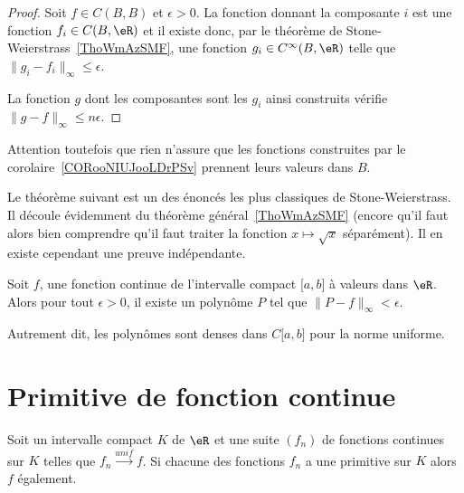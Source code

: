 \begin{proof}
    Soit \( f \in C(B,B)\) et \( \epsilon>0\). La fonction donnant la composante \( i\) est une fonction \( f_i\in C(B,\eR)\) et il existe donc, par le théorème de Stone-Weierstrass~\ref{ThoWmAzSMF}, une fonction \( g_i\in  C^{\infty}(B,\eR)\) telle que \( \| g_i-f_i \|_{\infty}\leq \epsilon\).

    La fonction \( g\) dont les composantes sont les \( g_i\) ainsi construits vérifie \( \| g-f \|_{\infty}\leq n\epsilon\).
\end{proof}

Attention toutefois que rien n'assure que les fonctions construites par le corolaire~\ref{CORooNIUJooLDrPSv} prennent leurs valeurs dans \( B\).

Le théorème suivant est un des énoncés les plus classiques de Stone-Weierstrass. Il découle évidemment du théorème général~\ref{ThoWmAzSMF} (encore qu'il faut alors bien comprendre qu'il faut traiter la fonction \( x\mapsto \sqrt{x}\) séparément). Il en existe cependant une preuve indépendante.

\begin{theorem}     \label{ThoGddfas}   
    Soit \( f\), une fonction continue de l'intervalle compact \( \mathopen[ a , b \mathclose]\) à valeurs dans \( \eR\). Alors pour tout \( \epsilon>0\), il existe un polynôme \( P\) tel que \( \| P-f \|_{\infty}<\epsilon\).

    Autrement dit, les polynômes sont denses dans \( C\mathopen[ a , b \mathclose]\) pour la norme uniforme.
\end{theorem}

\section{Primitive de fonction continue}

\begin{proposition}    \label{PropQACVooBnHtRJ}
    Soit un intervalle compact \( K\) de \( \eR\) et une suite \( (f_n)\) de fonctions continues sur \( K\) telles que \( f_n\stackrel{unif}{\longrightarrow}f\). Si chacune des fonctions \( f_n\) a une primitive sur \( K\) alors \( f\) également.
\end{proposition}

